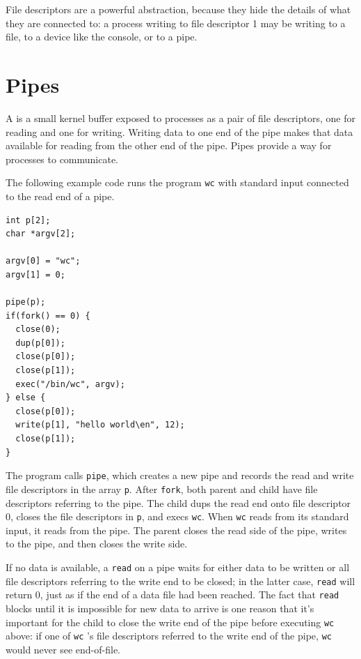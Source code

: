 File descriptors are a powerful abstraction,
because they hide the details of what they are connected to:
a process writing to file descriptor 1 may be writing to a
file, to a device like the console, or to a pipe.
\section{Pipes}

A 
is a small kernel buffer exposed to processes as a pair of
file descriptors, one for reading and one for writing.
Writing data to one end of the pipe
makes that data available for reading from the other end of the pipe.
Pipes provide a way for processes to communicate.

The following example code runs the program
\lstinline{wc}
with standard input connected to
the read end of a pipe.
\begin{lstlisting}[]
int p[2];
char *argv[2];

argv[0] = "wc";
argv[1] = 0;

pipe(p);
if(fork() == 0) {
  close(0);
  dup(p[0]);
  close(p[0]);
  close(p[1]);
  exec("/bin/wc", argv);
} else {
  close(p[0]);
  write(p[1], "hello world\en", 12);
  close(p[1]);
}
\end{lstlisting}
The program calls
\lstinline{pipe},
which creates a new pipe and records the read and write
file descriptors in the array
\lstinline{p}.
After
\lstinline{fork},
both parent and child have file descriptors referring to the pipe.
The child dups the read end onto file descriptor 0,
closes the file descriptors in
\lstinline{p},
and execs
\lstinline{wc}.
When 
\lstinline{wc}
reads from its standard input, it reads from the pipe.
The parent closes the read side of the pipe,
writes to the pipe,
and then closes the write side.

If no data is available, a
\lstinline{read}
on a pipe waits for either data to be written or all
file descriptors referring to the write end to be closed;
in the latter case,
\lstinline{read}
will return 0, just as if the end of a data file had been reached.
The fact that
\lstinline{read}
blocks until it is impossible for new data to arrive
is one reason that it's important for the child to
close the write end of the pipe
before executing
\lstinline{wc}
above: if one of
\lstinline{wc} 's
file descriptors referred to the write end of the pipe,
\lstinline{wc}
would never see end-of-file.

